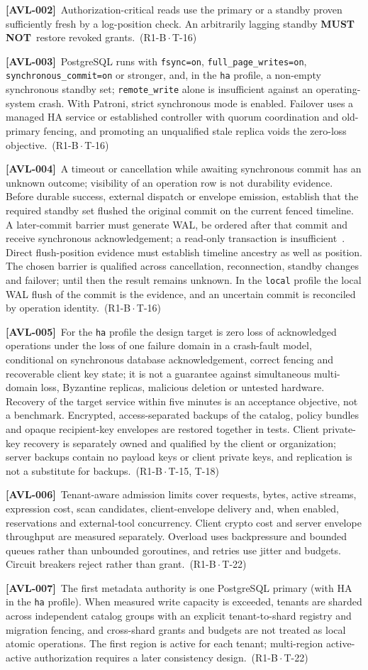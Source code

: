 \documentclass[11pt,a4paper]{article}
\newcommand{\mustnot}{\textbf{MUST NOT}}
\newcommand{\code}[1]{{\small\nolinkurl{#1}}}
\newcommand{\reqtag}[2]{{\footnotesize\color{accent}(#1\,$\cdot$\,#2)}}
\newcommand{\req}[4]{\par\noindent\hypertarget{req:#1}{\textbf{[#1]}}\ #4\ \reqtag{#2}{#3}\par}
\begin{document}
\req{AVL-002}{R1-B}{T-16}{Authorization-critical reads use the primary or a standby proven sufficiently fresh by a log-position check. An arbitrarily lagging standby \mustnot\ restore revoked grants.}
\req{AVL-003}{R1-B}{T-16}{PostgreSQL runs with \code{fsync=on}, \code{full_page_writes=on}, \code{synchronous_commit=on} or stronger, and, in the \code{ha} profile, a non-empty synchronous standby set; \code{remote_write} alone is insufficient against an operating-system crash. With Patroni, strict synchronous mode is enabled. Failover uses a managed HA service or established controller with quorum coordination and old-primary fencing, and promoting an unqualified stale replica voids the zero-loss objective.}
\req{AVL-004}{R1-B}{T-16}{A timeout or cancellation while awaiting synchronous commit has an unknown outcome; visibility of an operation row is not durability evidence. Before durable success, external dispatch or envelope emission, establish that the required standby set flushed the original commit on the current fenced timeline. A later-commit barrier must generate WAL, be ordered after that commit and receive synchronous acknowledgement; a read-only transaction is insufficient~\cite{postgresHA}. Direct flush-position evidence must establish timeline ancestry as well as position. The chosen barrier is qualified across cancellation, reconnection, standby changes and failover; until then the result remains unknown. In the \code{local} profile the local WAL flush of the commit is the evidence, and an uncertain commit is reconciled by operation identity.}
\req{AVL-005}{R1-B}{T-15, T-18}{For the \code{ha} profile the design target is zero loss of acknowledged operations under the loss of one failure domain in a crash-fault model, conditional on synchronous database acknowledgement, correct fencing and recoverable client key state; it is not a guarantee against simultaneous multi-domain loss, Byzantine replicas, malicious deletion or untested hardware. Recovery of the target service within five minutes is an acceptance objective, not a benchmark. Encrypted, access-separated backups of the catalog, policy bundles and opaque recipient-key envelopes are restored together in tests. Client private-key recovery is separately owned and qualified by the client or organization; server backups contain no payload keys or client private keys, and replication is not a substitute for backups.}
\req{AVL-006}{R1-B}{T-22}{Tenant-aware admission limits cover requests, bytes, active streams, expression cost, scan candidates, client-envelope delivery and, when enabled, reservations and external-tool concurrency. Client crypto cost and server envelope throughput are measured separately. Overload uses backpressure and bounded queues rather than unbounded goroutines, and retries use jitter and budgets. Circuit breakers reject rather than grant.}
\req{AVL-007}{R1-B}{T-22}{The first metadata authority is one PostgreSQL primary (with HA in the \code{ha} profile). When measured write capacity is exceeded, tenants are sharded across independent catalog groups with an explicit tenant-to-shard registry and migration fencing, and cross-shard grants and budgets are not treated as local atomic operations. The first region is active for each tenant; multi-region active-active authorization requires a later consistency design.}
\end{document}

